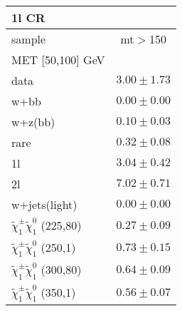 \begin{table}
\begin{center}
\small
\begin{tabular}{lc}
\hline
1l CR & \\
\hline
sample&mt$>$150\\
\hline
MET [50,100] GeV &  \\
\hline
data&$3.00\pm1.73$\\
\hline
w+bb&$0.00\pm0.00$\\
w+z(bb)&$0.10\pm0.03$\\
rare&$0.32\pm0.08$\\
1l&$3.04\pm0.42$\\
2l&$7.02\pm0.71$\\
w+jets(light)&$0.00\pm0.00$\\
$\tilde{\chi}_{1}^{\pm}\tilde{\chi}_{1}^{0}$ (225,80)&$0.27\pm0.09$\\
$\tilde{\chi}_{1}^{\pm}\tilde{\chi}_{1}^{0}$ (250,1)&$0.73\pm0.15$\\
$\tilde{\chi}_{1}^{\pm}\tilde{\chi}_{1}^{0}$ (300,80)&$0.64\pm0.09$\\
$\tilde{\chi}_{1}^{\pm}\tilde{\chi}_{1}^{0}$ (350,1)&$0.56\pm0.07$\\
\hline
\hline\hline
\hline
\end{tabular}
\end{center}
\end{table}
